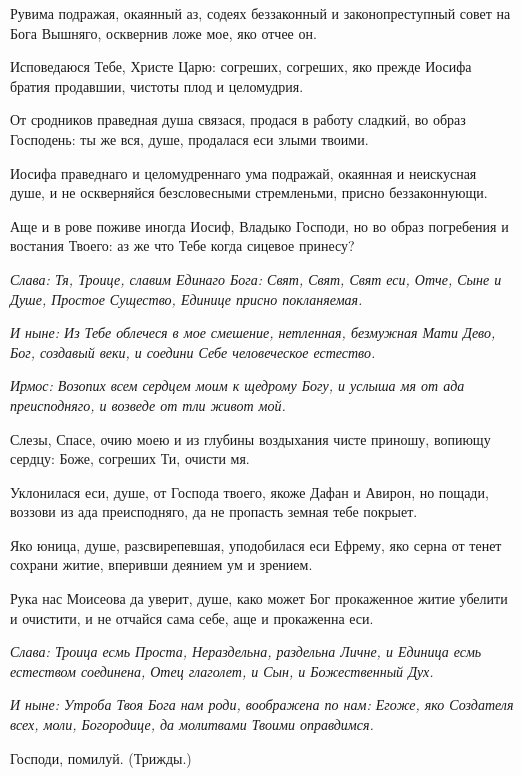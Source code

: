 Рувима подражая, окаянный аз, содеях беззаконный и законопреступный совет на Бога Вышняго, осквернив ложе мое, яко отчее он. 

Исповедаюся Тебе, Христе Царю: согреших, согреших, яко прежде Иосифа братия продавшии, чистоты плод и целомудрия. 

От сродников праведная душа связася, продася в работу сладкий, во образ Господень: ты же вся, душе, продалася еси злыми твоими. 

Иосифа праведнаго и целомудреннаго ума подражай, окаянная и неискусная душе, и не оскверняйся безсловесными стремленьми, присно беззаконнующи. 

Аще и в рове поживе иногда Иосиф, Владыко Господи, но во образ погребения и востания Твоего: аз же что Тебе когда сицевое принесу? 

\itshape Слава\normalfont{}: Тя, Троице, славим Единаго Бога: Свят, Свят, Свят еси, Отче, Сыне и Душе, Простое Существо, Единице присно покланяемая. 

\itshape И ныне\normalfont{}: Из Тебе облечеся в мое смешение, нетленная, безмужная Мати Дево, Бог, создавый веки, и соедини Себе человеческое естество. 


\itshape Ирмос\normalfont{}: Возопих всем сердцем моим к щедрому Богу, и услыша мя от ада преисподняго, и возведе от тли живот мой. 

Слезы, Спасе, очию моею и из глубины воздыхания чисте приношу, вопиющу сердцу: Боже, согреших Ти, очисти мя. 

Уклонилася еси, душе, от Господа твоего, якоже Дафан и Авирон, но пощади, воззови из ада преисподняго, да не пропасть земная тебе покрыет. 

Яко юница, душе, разсвирепевшая, уподобилася еси Ефрему, яко серна от тенет сохрани житие, вперивши деянием ум и зрением. 

Рука нас Моисеова да уверит, душе, како может Бог прокаженное житие убелити и очистити, и не отчайся сама себе, аще и прокаженна еси. 

\itshape Слава\normalfont{}: Троица есмь Проста, Нераздельна, раздельна Личне, и Единица есмь естеством соединена, Отец глаголет, и Сын, и Божественный Дух. 

\itshape И ныне\normalfont{}: Утроба Твоя Бога нам роди, воображена по нам: Егоже, яко Создателя всех, моли, Богородице, да молитвами Твоими оправдимся. 

Господи, помилуй. (Трижды.) 

